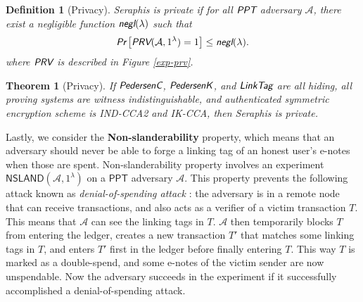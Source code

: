 \documentclass{article}
\theoremstyle{plain}
\newtheorem{definition}{Definition}[section]
\newtheorem{theorem}{Theorem}[section]
\theoremstyle{remark}
\begin{document}
\begin{definition}[Privacy]
Seraphis is private if for all $\emph{\textsf{PPT}}$ adversary $\mathcal{A}$, there exist a negligible function $\emph{\textsf{negl}}(\lambda)$ such that
\begin{align*}
\emph{\textsf{Pr}}
\left[
\emph{\textsf{PRV}}(\mathcal{A}, 1^{\lambda})=1
\right]
\le \emph{\textsf{negl}}(\lambda).
\end{align*}
where $\emph{\textsf{PRV}}$ is described in Figure \ref{exp-prv}.
\end{definition}
\begin{theorem}[Privacy]\label{thm-prv}
If $\emph{\textsf{PedersenC}}$, $\emph{\textsf{PedersenK}}$, and $\emph{\textsf{LinkTag}}$ are all hiding, all proving systems are witness indistinguishable, and authenticated symmetric encryption scheme is IND-CCA2 and IK-CCA, then Seraphis is private.  
\end{theorem}

Lastly, we consider the \textbf{Non-slanderability} property, which means that an adversary should never be able to forge a linking tag of an honest user's e-notes when those are spent. Non-slanderability property involves an experiment $\textsf{NSLAND}(\mathcal{A}, 1^{\lambda})$ on a $\textsf{PPT}$ adversary $\mathcal{A}$. This property prevents the following attack known as \textit{denial-of-spending attack} \cite{denial-of-spend}: the adversary is in a remote node that can receive transactions, and also acts as a verifier of a victim transaction $T$. This means that $\mathcal{A}$ can see the linking tags in $T$. $\mathcal{A}$ then temporarily blocks $T$ from entering the ledger, creates a new transaction $T'$ that matches some linking tags in $T$, and enters $T'$ first in the ledger before finally entering $T$. This way $T$ is marked as a double-spend, and some e-notes of the victim sender are now unspendable. Now the adversary succeeds in the experiment if it successfully accomplished a denial-of-spending attack.
\end{document}
